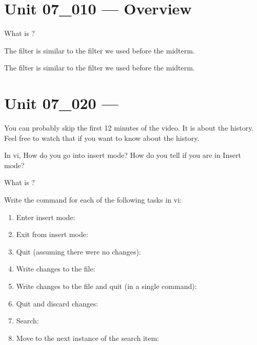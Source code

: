 \documentclass[letterpaper,12pt]{exam}
\newcommand{\unit}{Unit 07}
\begin{document}
\begin {questions}

\section*{\unit\_010 --- Overview} %

\begin{samepage}
	\question What is ?
	\vspace{5mm}
\end{samepage}

\begin{samepage}
\question The  filter is similar to the {\color{blue}\fillin[][2cm]} filter we used before the midterm.
\end{samepage}

\begin{samepage}
	\question The  filter is similar to the {\color{blue}\fillin[][2cm]} filter we used before the midterm.
\end{samepage}
	
\section*{\unit\_020 --- } %

You can probably skip the first 12 minutes of the video.  It is about the history.  Feel free to watch that if you want to know about the history.

\begin{samepage}
\question In vi, How do you go into insert mode? How do you tell if you are in Insert mode?
\vspace{5mm}
\end{samepage}

\begin{samepage}
\question What is ?
\vspace{5mm}
\end{samepage}

\begin{samepage}
\question Write the command for each of the following tasks in vi: 
\begin{enumerate}
\item
Enter insert mode:
\item Exit from insert mode:
\item Quit (assuming there were no changes):
\item Write changes to the file:
\item Write changes to the file and quit (in a single command):
\item Quit and discard changes:
\item Search:
\item Move to the next instance of the search item:
\end{enumerate}
\end{samepage}


\end{questions}
\end{document}
